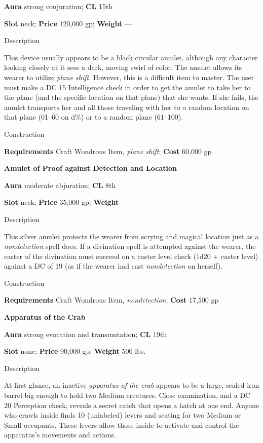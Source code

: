 \textbf{Aura} strong conjuration;\textbf{ CL }15th
				
\textbf{Slot} neck; \textbf{Price} 120,000 gp; \textbf{Weight} ---
				
Description
				
This device usually appears to be a black circular amulet, although any character looking closely at it sees a dark, moving swirl of color. The amulet allows its wearer to utilize \textit{plane shift}. However, this is a difficult item to master. The user must make a DC 15 Intelligence check in order to get the amulet to take her to the plane (and the specific location on that plane) that she wants. If she fails, the amulet transports her and all those traveling with her to a random location on that plane (01--60 on d\%) or to a random plane (61--100). 
				
Construction
				
\textbf{Requirements} Craft Wondrous Item, \textit{plane shift}; \textbf{Cost }60,000 gp
				
\textbf{Amulet of Proof against Detection and Location}
				
\textbf{Aura} moderate abjuration;\textbf{ CL }8th
				
\textbf{Slot} neck; \textbf{Price} 35,000 gp; \textbf{Weight} ---
				
Description
				
This silver amulet protects the wearer from scrying and magical location just as a \textit{nondetection }spell does. If a divination spell is attempted against the wearer, the caster of the divination must succeed on a caster level check (1d20 + caster level) against a DC of 19 (as if the wearer had cast \textit{nondetection }on herself). 
				
Construction
				
\textbf{Requirements} Craft Wondrous Item, \textit{nondetection}; \textbf{Cost }17,500 gp
				
\textbf{Apparatus of the Crab}
				
\textbf{Aura} strong evocation and transmutation; \textbf{CL} 19th
				
\textbf{Slot} none; \textbf{Price} 90,000 gp; \textbf{Weight} 500 lbs.
				
Description
				
At first glance, an inactive \textit{apparatus of the crab} appears to be a large, sealed iron barrel big enough to hold two Medium creatures. Close examination, and a DC 20 Perception check, reveals a secret catch that opens a hatch at one end. Anyone who crawls inside finds 10 (unlabeled) levers and seating for two Medium or Small occupants. These levers allow those inside to activate and control the apparatus's movements and actions.

